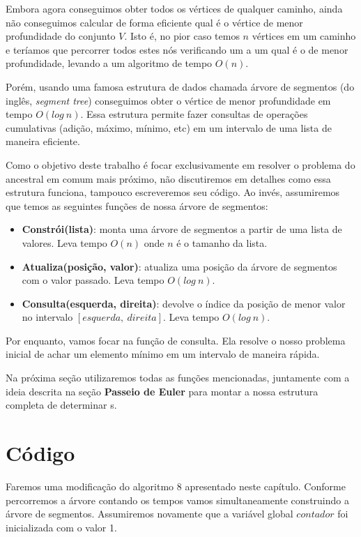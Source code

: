 Embora agora conseguimos obter todos os vértices de qualquer caminho, ainda não conseguimos calcular de forma eficiente qual é o vértice de menor profundidade do conjunto $V$. Isto é, no pior caso temos $n$ vértices em um caminho e teríamos que percorrer todos estes nós verificando um a um qual é o de menor profundidade, levando a um algoritmo de tempo $O(n)$.

Porém, usando uma famosa estrutura de dados chamada árvore de segmentos \cite{arvore-segmentos} (do inglês, \textit{segment tree}) conseguimos obter o vértice de menor profundidade em tempo $O(log\ n)$. Essa estrutura permite fazer consultas de operações cumulativas (adição, máximo, mínimo, etc) em um intervalo de uma lista de maneira eficiente.

Como o objetivo deste trabalho é focar exclusivamente em resolver o problema do ancestral em comum mais próximo, não discutiremos em detalhes como essa estrutura funciona, tampouco escreveremos seu código. Ao invés, assumiremos que temos as seguintes funções de nossa árvore de segmentos:

\begin{itemize}
    \item \textbf{Constrói(lista)}: monta uma árvore de segmentos a partir de uma lista de valores. Leva tempo $O(n)$ onde $n$ é o tamanho da lista.
    \item \textbf{Atualiza(posição, valor)}: atualiza uma posição da árvore de segmentos com o valor passado. Leva tempo $O(log\ n)$.
    \item \textbf{Consulta(esquerda, direita)}: devolve o índice da posição de menor valor no intervalo $[esquerda,\ direita]$. Leva tempo $O(log\ n)$.
\end{itemize}

Por enquanto, vamos focar na função de consulta. Ela resolve o nosso problema inicial de achar um elemento mínimo em um intervalo de maneira rápida.

Na próxima seção utilizaremos todas as funções mencionadas, juntamente com a ideia descrita na seção \textbf{Passeio de Euler} para montar a nossa estrutura completa de determinar \LCA s.

\section{Código}

Faremos uma modificação do algoritmo 8 apresentado neste capítulo. Conforme percorremos a árvore contando os tempos vamos simultaneamente construindo a árvore de segmentos. Assumiremos novamente que a variável global $contador$ foi inicializada com o valor 1.

